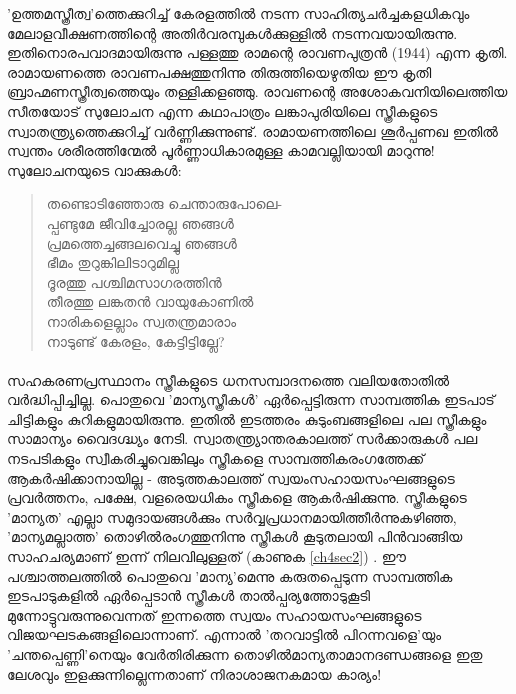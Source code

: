 \label{ch4box3} %
\begin{tcolorbox}[%
 breakable, %
  arc=0mm, 
  left=1pt, right = 1pt, 
  boxrule=0mm,
  colback = {blue!10}, %
] 
\noindent

'ഉത്തമസ്ത്രീത്വ'ത്തെക്കുറിച്ച് കേരളത്തിൽ നടന്ന സാഹിത്യചർച്ചകളധികവും മേലാളവീക്ഷണത്തിന്റെ അതിർവരമ്പുകൾക്കുള്ളിൽ നടന്നവയായിരുന്നു. ഇതിനൊരപവാദമായിരുന്നു പള്ളത്തു രാമന്റെ രാവണപുത്രൻ (1944) എന്ന കൃതി. രാമായണത്തെ രാവണപക്ഷത്തുനിന്നു തിരുത്തിയെഴുതിയ ഈ കൃതി ബ്രാഹ്മണസ്ത്രീത്വത്തെയും തള്ളിക്കളഞ്ഞു. രാവണന്റെ അശോകവനിയിലെത്തിയ സീതയോട് സുലോചന എന്ന കഥാപാത്രം ലങ്കാപുരിയിലെ സ്ത്രീകളുടെ സ്വാതന്ത്യ്രത്തെക്കുറിച്ച് വർണ്ണിക്കുന്നുണ്ട്. രാമായണത്തിലെ ശൂർപ്പണഖ ഇതിൽ സ്വന്തം ശരീരത്തിന്മേൽ പൂർണ്ണാധികാരമുള്ള കാമവല്ലിയായി മാറുന്നു!
സുലോചനയുടെ വാക്കുകൾ:
\begin{quote}
തണ്ടൊടിഞ്ഞോരു ചെന്താരുപോലെ-\\
പ്പണ്ടുമേ ജീവിച്ചോരല്ല ഞങ്ങൾ\\
പ്രമത്തെച്ചങ്ങലവെച്ചു ഞങ്ങൾ\\
ഭീമം തുറുങ്കിലിടാറുമില്ല\\
ദൂരത്തു പശ്ചിമസാഗരത്തിൻ\\
തീരത്തു ലങ്കതൻ വായുകോണിൽ\\
നാരികളെല്ലാം സ്വതന്ത്രമാരാം\\
നാടുണ്ട് കേരളം, കേട്ടിട്ടില്ലേ?\\
\end{quote}
\end{tcolorbox}

\paragraph{}സഹകരണപ്രസ്ഥാനം സ്ത്രീകളുടെ ധനസമ്പാദനത്തെ വലിയതോതിൽ വർദ്ധിപ്പിച്ചില്ല. പൊതുവെ 'മാന്യസ്ത്രീകൾ' ഏർപ്പെട്ടിരുന്ന സാമ്പത്തിക ഇടപാട് ചിട്ടികളും കുറികളുമായിരുന്നു. ഇതിൽ ഇടത്തരം കുടുംബങ്ങളിലെ പല സ്ത്രീകളും സാമാന്യം വൈദഗ്ദ്ധ്യം നേടി. സ്വാതന്ത്ര്യാന്തരകാലത്ത് സർക്കാരുകൾ പല നടപടികളും സ്വീകരിച്ചുവെങ്കിലും സ്ത്രീകളെ സാമ്പത്തികരംഗത്തേക്ക് ആകർഷിക്കാനായില്ല - അടുത്തകാലത്ത് സ്വയംസഹായസംഘങ്ങളുടെ പ്രവർത്തനം, പക്ഷേ, വളരെയധികം സ്ത്രീകളെ ആകർഷിക്കുന്നു. സ്ത്രീകളുടെ 'മാന്യത' എല്ലാ സമുദായങ്ങൾക്കും സർവ്വപ്രധാനമായിത്തീർന്നുകഴിഞ്ഞ, 'മാന്യമല്ലാത്ത' തൊഴിൽരംഗത്തുനിന്നു സ്ത്രീകൾ കൂടുതലായി പിൻവാങ്ങിയ സാഹചര്യമാണ് ഇന്ന് നിലവിലുള്ളത് (കാണുക \ref{ch4sec2}) . ഈ പശ്ചാത്തലത്തിൽ പൊതുവെ 'മാന്യ'മെന്നു കരുതപ്പെടുന്ന സാമ്പത്തിക ഇടപാടുകളിൽ ഏർപ്പെടാൻ സ്ത്രീകൾ താൽപ്പര്യത്തോടുകൂടി മുന്നോട്ടുവരുന്നുവെന്നത് ഇന്നത്തെ സ്വയം സഹായസംഘങ്ങളുടെ വിജയഘടകങ്ങളിലൊന്നാണ്. എന്നാൽ 'തറവാട്ടിൽ പിറന്നവളെ'യും 'ചന്തപ്പെണ്ണി'നെയും വേർതിരിക്കുന്ന തൊഴിൽമാന്യതാമാനദണ്ഡങ്ങളെ ഇതു ലേശവും ഇളക്കുന്നില്ലെന്നതാണ് നിരാശാജനകമായ കാര്യം!


